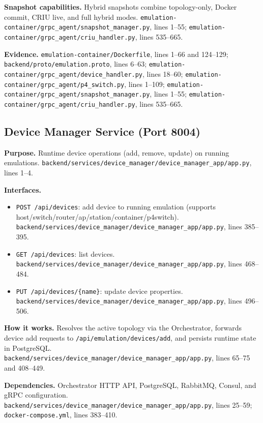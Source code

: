 \documentclass[10pt,a4paper]{article}
\begin{document}
\textbf{Snapshot capabilities.} Hybrid snapshots combine topology-only, Docker commit, CRIU live, and full hybrid modes. \texttt{emulation-container/grpc\_agent/snapshot\_manager.py}, lines 1--55; \texttt{emulation-container/grpc\_agent/criu\_handler.py}, lines 535--665.

\textbf{Evidence.} \texttt{emulation-container/Dockerfile}, lines 1--66 and 124--129; \texttt{backend/proto/emulation.proto}, lines 6--63; \texttt{emulation-container/grpc\_agent/device\_handler.py}, lines 18--60; \texttt{emulation-container/grpc\_agent/p4\_switch.py}, lines 1--109; \texttt{emulation-container/grpc\_agent/snapshot\_manager.py}, lines 1--55; \texttt{emulation-container/grpc\_agent/criu\_handler.py}, lines 535--665.

\subsection{Device Manager Service (Port 8004)}

\textbf{Purpose.} Runtime device operations (add, remove, update) on running emulations. \texttt{backend/services/device\_manager/device\_manager\_app/app.py}, lines 1--4.

\textbf{Interfaces.}
\begin{itemize}[leftmargin=*]
\item \texttt{POST /api/devices}: add device to running emulation (supports host/switch/router/ap/station/container/p4switch). \texttt{backend/services/device\_manager/device\_manager\_app/app.py}, lines 385--395.
\item \texttt{GET /api/devices}: list devices. \texttt{backend/services/device\_manager/device\_manager\_app/app.py}, lines 468--484.
\item \texttt{PUT /api/devices/\{name\}}: update device properties. \texttt{backend/services/device\_manager/device\_manager\_app/app.py}, lines 496--506.
\end{itemize}

\textbf{How it works.} Resolves the active topology via the Orchestrator, forwards device add requests to \texttt{/api/emulation/devices/add}, and persists runtime state in PostgreSQL. \texttt{backend/services/device\_manager/device\_manager\_app/app.py}, lines 65--75 and 408--449.

\textbf{Dependencies.} Orchestrator HTTP API, PostgreSQL, RabbitMQ, Consul, and gRPC configuration. \texttt{backend/services/device\_manager/device\_manager\_app/app.py}, lines 25--59; \texttt{docker-compose.yml}, lines 383--410.
\end{document}
